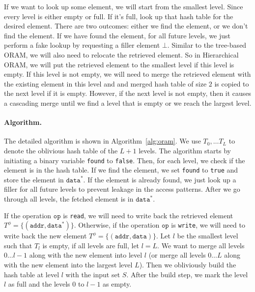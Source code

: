 If we want to look up some element, we will start from the smallest level.
Since every level is either empty or full. If it's full, 
look up that hash table for the desired element.
There are two outcomes: either we find the element, or we don't find the element.
If we have found the element, for all future levels, we just 
perform a fake lookup by requesting a filler element $\bot$.
Similar to the tree-based ORAM, 
we will also need to relocate the retrieved element.
So in Hierarchical ORAM, we will put the retrieved element 
to the smallest level if this level is empty.
If this level is not empty, we will need to merge the retrieved element with the existing element in this level and 
and merged hash table of size $2$ is copied to the next level
if it is empty. 
However, if the next level is not empty, then 
it causes a cascading merge until we find a level that is empty
or we reach the largest level.  

\paragraph{Algorithm.} The detailed algorithm is 
shown in Algorithm~\ref{alg:oram}. 
We use $T_0, \ldots T_L$ to denote the oblivious hash table
of the $L+1$ levels.
The algorithm starts by initiating a binary variable \texttt{found} to \texttt{false}.
Then, for each level, we check if the element is in the hash table. 
If we find the element, we set \texttt{found} to \texttt{true} and store the element in $\texttt{data}^*$.
If the element is already found, we just look up a filler 
for all future levels 
to prevent leakage in the access patterns.
After we go through all levels, 
the fetched element is in $\texttt{data}^*$.

If the operation $\texttt{op}$ is \texttt{read}, we will need to write back 
the retrieved element $T^\phi = \{(\texttt{addr}, \texttt{data}^*)\}$.
Otherwise, if the operation $\texttt{op}$ is \texttt{write}, we will need to write back the new element $T^\phi = \{(\texttt{addr}, \texttt{data})\}$.
Let $l$ be the smallest level such that $T_l$ is empty, if all levels are full, let $l = L$.
We want to merge all levels $0\ldots l-1$ along with the new element 
into level $l$ (or merge all levels $0\ldots L$ along with the new
element into the largest level $L$). 
Then we obliviously build the hash table at level $l$ with the input set $S$.
After the build step, we mark the level $l$ as 
full and the levels $0$ to $l-1$ as empty.

